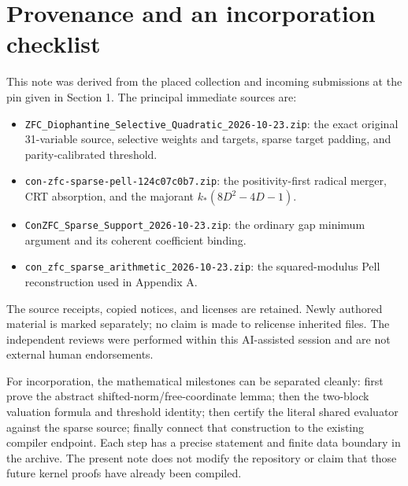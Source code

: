\documentclass[11pt]{article}
\theoremstyle{remark}\newtheorem{remark}[theorem]{Remark}
\begin{document}
\section{Provenance and an incorporation checklist}

This note was derived from the placed collection and incoming submissions
at the pin given in Section 1. The principal immediate sources are:
\begin{itemize}
\item \texttt{ZFC\_Diophantine\_Selective\_Quadratic\_2026-10-23.zip}:
the exact original 31-variable source, selective weights and targets,
sparse target padding, and parity-calibrated threshold.
\item \texttt{con-zfc-sparse-pell-124c07c0b7.zip}:
the positivity-first radical merger, CRT absorption, and
the majorant $k_*(8D^2-4D-1)$.
\item \texttt{ConZFC\_Sparse\_Support\_2026-10-23.zip}:
the ordinary gap minimum argument and its coherent coefficient binding.
\item \texttt{con\_zfc\_sparse\_arithmetic\_2026-10-23.zip}:
the squared-modulus Pell reconstruction used in Appendix A.
\end{itemize}
The source receipts, copied notices, and licenses are retained. Newly
authored material is marked separately; no claim is made to relicense
inherited files. The independent reviews were performed within this
AI-assisted session and are not external human endorsements.

For incorporation, the mathematical milestones can be separated cleanly:
first prove the abstract shifted-norm/free-coordinate lemma; then the
two-block valuation formula and threshold identity; then certify the
literal shared evaluator against the sparse source; finally connect that
construction to the existing compiler endpoint. Each step has a precise
statement and finite data boundary in the archive. The present note does
not modify the repository or claim that those future kernel proofs have
already been compiled.
\end{document}
